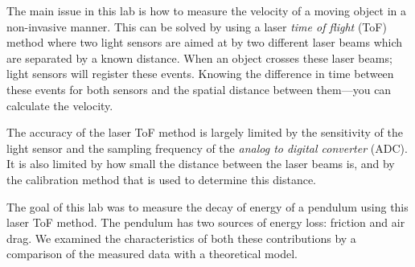 The main issue in this lab is how to measure the velocity of a moving object in a non-invasive manner.
This can be solved by using a laser \emph{time of flight} (ToF) method where two light sensors are aimed at by two different laser beams which are separated by a known distance. When an object crosses these laser beams; light sensors will register these events. Knowing the difference in time between these events for both sensors and the spatial distance between them---you can calculate the velocity.

The accuracy of the laser ToF method is largely limited by the sensitivity of the light sensor and 
the sampling frequency of the \emph{analog to digital converter} (ADC).
It is also limited by how small the distance between the laser beams is, and by the calibration method that is used to determine this distance.


The goal of this lab was to measure the decay of energy of a pendulum using this laser ToF method.
The pendulum has two sources of energy loss: friction and air drag. We examined the characteristics of both these contributions by a comparison of the measured data with a theoretical model.